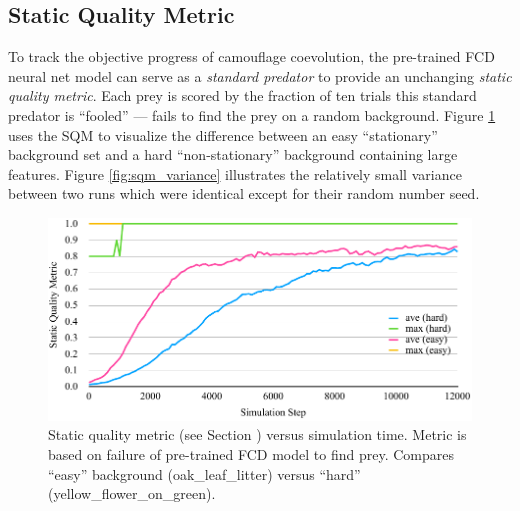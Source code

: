 \documentclass[letterpaper]{article}
\newcommand{\jargon}[1]{\textit{#1}}
\newcommand{\runID}{\footnotesize}
\begin{document}


\subsection{Static Quality Metric}
\label{subsec:sqm}

To track the objective progress of camouflage coevolution, the pre-trained FCD neural net model can serve as a \jargon{standard predator} to provide an unchanging \jargon{static quality metric}. Each prey is scored by the fraction of ten trials this standard predator is “fooled” --- fails to find the prey on a random background. Figure \ref{fig:sqm_plot} uses the SQM to visualize the difference between an easy “stationary” background set and a hard “non-stationary” background containing large features. Figure \ref{fig:sqm_variance} illustrates the relatively small variance between two runs which were identical except for their random number seed.
\par


\begin{figure}[t]
    \includegraphics[width=\columnwidth]{SQM_plot_easy_vs_hard.pdf}
    \caption{Static quality metric (see Section ) versus simulation time. Metric is based on failure of pre-trained FCD model to find prey. Compares “easy” background ({\runID oak\_leaf\_litter}) versus “hard” ({\runID yellow\_flower\_on\_green}).}
    \label{fig:sqm_plot}
\end{figure}
\end{document}
